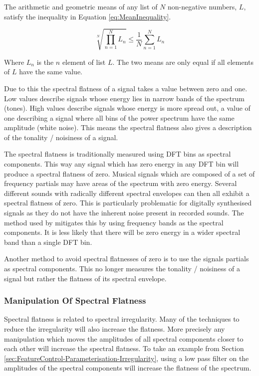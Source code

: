 		The arithmetic and geometric means of any list of $N$ non-negative numbers, $L$, satisfy the inequality in
		Equation \ref{eq:MeanInequality}.

		\begin{equation}
			\sqrt[N]{\prod_{n = 1}^{N} L_{n}} \leq \frac{1}{N} \sum_{n = 1}^{N} L_{n}
			\label{eq:MeanInequality}
		\end{equation}

		Where $L_{n}$ is the $n$ element of list $L$. The two means are only equal if all elements of $L$
		have the same value.

		Due to this the spectral flatness of a signal takes a value between zero and one. Low values describe
		signals whose energy lies in narrow bands of the spectrum (tones). High values describe signals whose
		energy is more spread out, a value of one describing a signal where all bins of the power spectrum have the
		same amplitude (white noise). This means the spectral flatness also gives a description of the tonality /
		noisiness of a signal.

		The spectral flatness is traditionally measured using DFT bins as spectral components. This way any signal
		which has zero energy in any DFT bin will produce a spectral flatness of zero. Musical signals which are
		composed of a set of frequency partials may have areas of the spectrum with zero energy. Several different
		sounds with radically different spectral envelopes can then all exhibit a spectral flatness of zero. This
		is particularly problematic for digitally synthesised signals as they do not have the inherent noise
		present in recorded sounds. The method used by \citet{peeters2004a} mitigates this by using frequency bands
		as the spectral components. It is less likely that there will be zero energy in a wider spectral band than
		a single DFT bin. 
		
		Another method to avoid spectral flatnesses of zero is to use the signals partials as spectral components.
		This no longer measures the tonality / noisiness of a signal but rather the flatness of its spectral
		envelope.

		\subsubsection*{Manipulation Of Spectral Flatness}
			Spectral flatness is related to spectral irregularity. Many of the techniques to reduce the
			irregularity will also increase the flatness. More precisely any manipulation which moves the
			amplitudes of all spectral components closer to each other will increase the spectral flatness. To
			take an example from Section \ref{sec:FeatureControl-Parameterisation-Irregularity}, using a low
			pass filter on the amplitudes of the spectral components will increase the flatness of the
			spectrum.

